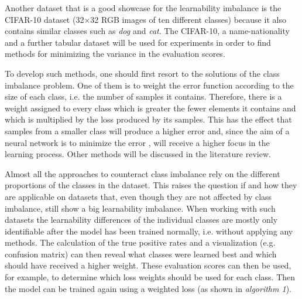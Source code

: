 \documentclass[journal]{IEEEtran}
\begin{document}
Another dataset that is a good showcase for the learnability imbalance is the CIFAR-10 \cite{krizhevsky2009learning} dataset (32$\times$32 RGB images of ten different classes) because it also contains similar classes such as \emph{dog} and \emph{cat}.
The CIFAR-10, a name-nationality and a further tabular dataset will be used for experiments in order to find methods for minimizing the variance in the evaluation scores.

To develop such methods, one should first resort to the solutions of the class imbalance problem.
One of them is to weight the error function \cite{cui2019class} according to the size of each class, i.e. the number of samples it contains.
Therefore, there is a weight assigned to every class which is greater the fewer elements it contains and which is multiplied by the loss produced by its samples. %
This has the effect that samples from a smaller class will produce a higher error and, since the aim of a neural network is to minimize the error \cite{rumelhart1985learning}, will receive a higher focus in the learning process.
Other methods will be discussed in the literature review.

Almost all the approaches to counteract class imbalance rely on the different proportions of the classes in the dataset.
This raises the question if and how they are applicable on datasets that, even though they are not affected by class imbalance, still show a big learnability imbalance.
When working with such datasets the learnability differences of the individual classes are mostly only identifiable after the model has been trained normally, i.e. without applying any methods. %
The calculation of the true positive rates and a visualization (e.g. confusion matrix) can then reveal what classes were learned best and which should have received a higher weight.
These evaluation scores can then be used, for example, to determine which loss weights should be used for each class. 
Then the model can be trained again using a weighted loss (as shown in \emph{algorithm 1}).
\end{document}
